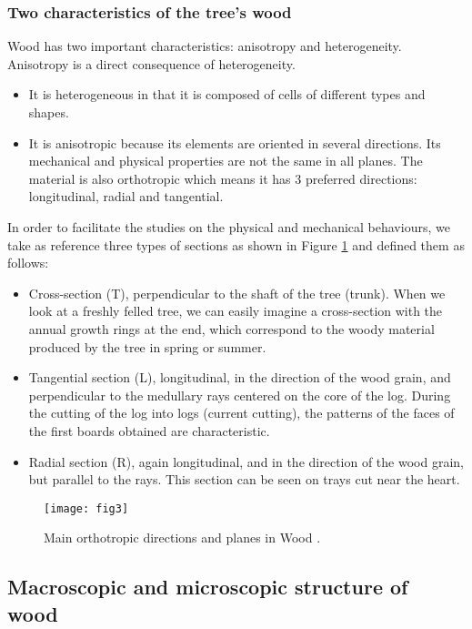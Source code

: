 \subsubsection{Two characteristics of the tree's wood}

Wood has two important characteristics: anisotropy and heterogeneity. Anisotropy is a direct consequence of heterogeneity.

\begin{itemize}
	\item It is heterogeneous in that it is composed of cells of different types and shapes. 
	\item It is anisotropic because its elements are oriented in several directions. Its mechanical and physical properties are not the same in all planes. The material is also orthotropic which means it has 3 preferred directions: longitudinal, radial and tangential.
\end{itemize}

In order to facilitate the studies on the physical and mechanical behaviours, we take as reference three types of sections as shown in Figure \ref{fig:fig3} and defined them as follows:

\begin{itemize}
	\item Cross-section (T), perpendicular to the shaft of the tree (trunk). When we look at a freshly felled tree, we can easily imagine a cross-section with the annual growth rings at the end, which correspond to the woody material produced by the tree in spring or summer.
	\item Tangential section (L), longitudinal, in the direction of the wood grain, and perpendicular to the medullary rays centered on the core of the log. During the cutting of the log into logs (current cutting), the patterns of the faces of the first boards obtained are characteristic.
	\item Radial section (R), again longitudinal, and in the direction of the wood grain, but parallel
	to the rays. This section can be seen on trays cut near the heart.
\end{itemize}


\begin{figure}[htp]
	\centering
	\texttt{[image: fig3]}
	\caption{Main orthotropic directions and planes in Wood \citep{Gómez2022}.}
	\label{fig:fig3}
\end{figure}

\newpage

\subsection{Macroscopic and microscopic structure of wood}

